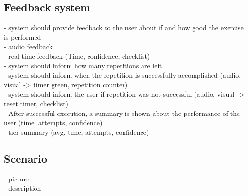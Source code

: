 \subsection{Feedback system}
- system should provide feedback to the user about if and how good the exercise is performed
\\ - audio feedback
\\- real time feedback (Time, confidence, checklist)
\\- system should inform how many repetitions are left
\\- system should inform when the repetition is successfully accomplished (audio, visual -> timer green, repetition counter)
\\- system should inform the user if repetition was not successful (audio, visual -> reset timer, checklist)
\\- After successful execution, a summary is shown about the performance of the user (time, attempts, confidence)
\\- tier summary (avg. time, attempts, confidence)

\subsection{Scenario}\label{4_1_requirements_scenario}
- picture
\\ - description